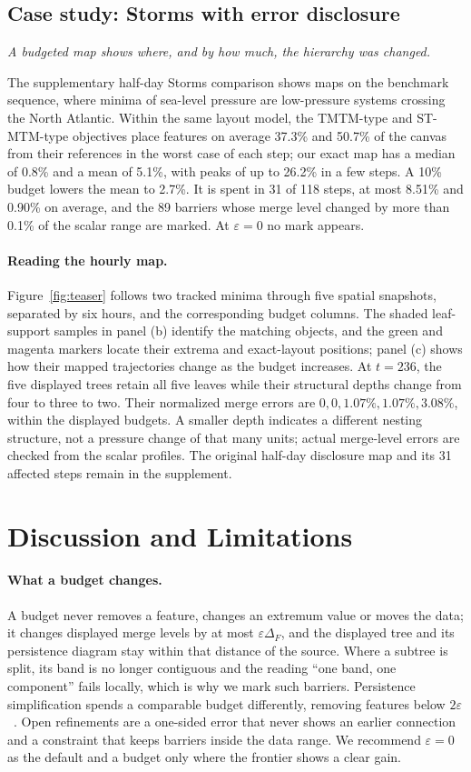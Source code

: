 \documentclass[review]{vgtc}                 %
\newcommand{\takeaway}[1]{\noindent\emph{#1}\par\smallskip}
\begin{document}
\subsection{Case study: Storms with error disclosure}
\takeaway{A budgeted map shows where, and by how much, the hierarchy was changed.}
The supplementary half-day Storms comparison shows maps on the benchmark sequence, where minima of sea-level pressure are low-pressure systems crossing the North Atlantic. Within the same layout model, the TMTM-type and ST-MTM-type objectives place features on average 37.3\% and 50.7\% of the canvas from their references in the worst case of each step; our exact map has a median of 0.8\% and a mean of 5.1\%, with peaks of up to 26.2\% in a few steps. A 10\% budget lowers the mean to 2.7\%. It is spent in 31 of 118 steps, at most 8.51\% and 0.90\% on average, and the 89 barriers whose merge level changed by more than 0.1\% of the scalar range are marked. At $\varepsilon=0$ no mark appears.

\paragraph{Reading the hourly map.} Figure~\ref{fig:teaser} follows two tracked minima through five spatial snapshots, separated by six hours, and the corresponding budget columns. The shaded leaf-support samples in panel (b) identify the matching objects, and the green and magenta markers locate their extrema and exact-layout positions; panel (c) shows how their mapped trajectories change as the budget increases. At $t=236$, the five displayed trees retain all five leaves while their structural depths change from four to three to two. Their normalized merge errors are $0,0,1.07\%,1.07\%,3.08\%$, within the displayed budgets. A smaller depth indicates a different nesting structure, not a pressure change of that many units; actual merge-level errors are checked from the scalar profiles. The original half-day disclosure map and its 31 affected steps remain in the supplement.

\section{Discussion and Limitations}\label{sec:discussion}
\paragraph{What a budget changes.} A budget never removes a feature, changes an extremum value or moves the data; it changes displayed merge levels by at most $\varepsilon\Delta_F$, and the displayed tree and its persistence diagram stay within that distance of the source. Where a subtree is split, its band is no longer contiguous and the reading ``one band, one component'' fails locally, which is why we mark such barriers. Persistence simplification spends a comparable budget differently, removing features below $2\varepsilon$~\cite{Edelsbrunner:2002:TPS,Tierny:2012:GTS}. Open refinements are a one-sided error that never shows an earlier connection and a constraint that keeps barriers inside the data range. We recommend $\varepsilon=0$ as the default and a budget only where the frontier shows a clear gain.
\end{document}
